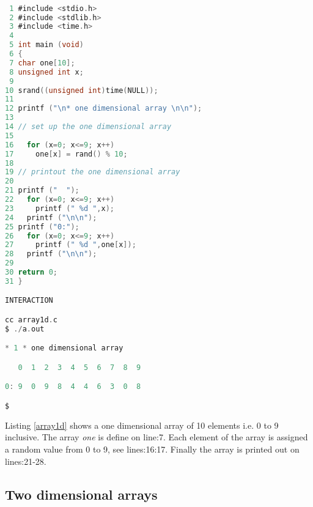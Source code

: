 \begin{lstlisting}[language=C,showstringspaces=false,caption={File: array1d.c, one dimensional array},captionpos=b,label=array1d]

 1 #include <stdio.h>
 2 #include <stdlib.h>
 3 #include <time.h>
 4 
 5 int main (void)
 6 {
 7 char one[10];
 8 unsigned int x;
 9 
10 srand((unsigned int)time(NULL));
11 
12 printf ("\n* one dimensional array \n\n");
13 
14 // set up the one dimensional array
15 
16   for (x=0; x<=9; x++)
17     one[x] = rand() % 10;
18 
19 // printout the one dimensional array
20 
21 printf ("  ");
22   for (x=0; x<=9; x++)  
23     printf (" %d ",x);
24   printf ("\n\n");
25 printf ("0:");  
26   for (x=0; x<=9; x++)  
27     printf (" %d ",one[x]);    
28   printf ("\n\n");
29    
30 return 0;
31 }

INTERACTION

cc array1d.c
$ ./a.out

* 1 * one dimensional array 

   0  1  2  3  4  5  6  7  8  9 

0: 9  0  9  8  4  4  6  3  0  8 

$
\end{lstlisting}

Listing \ref{array1d} shows a one dimensional array of 10 elements i.e. 0 to 9 inclusive. The array \textit{one} is define on line:7. Each element of the array is assigned a random value from 0 to 9, see lines:16:17. Finally the array is printed out on lines:21-28.

\subsection{Two dimensional arrays}

